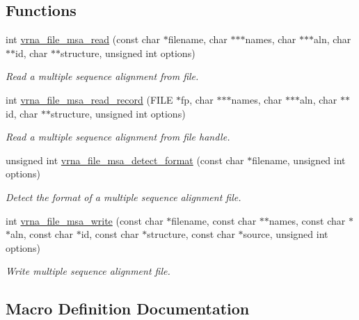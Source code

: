 \subsection*{Functions}
\begin{DoxyCompactItemize}
\item 
int \mbox{\hyperlink{group__file__formats__msa_gad02d5d12bda54611c915a1019323b7be}{vrna\+\_\+file\+\_\+msa\+\_\+read}} (const char $\ast$filename, char $\ast$$\ast$$\ast$names, char $\ast$$\ast$$\ast$aln, char $\ast$$\ast$id, char $\ast$$\ast$structure, unsigned int options)
\begin{DoxyCompactList}\small\item\em Read a multiple sequence alignment from file. \end{DoxyCompactList}\item 
int \mbox{\hyperlink{group__file__formats__msa_gad4203a438622b2df7bc2f16578d54799}{vrna\+\_\+file\+\_\+msa\+\_\+read\+\_\+record}} (F\+I\+LE $\ast$fp, char $\ast$$\ast$$\ast$names, char $\ast$$\ast$$\ast$aln, char $\ast$$\ast$id, char $\ast$$\ast$structure, unsigned int options)
\begin{DoxyCompactList}\small\item\em Read a multiple sequence alignment from file handle. \end{DoxyCompactList}\item 
unsigned int \mbox{\hyperlink{group__file__formats__msa_gade4fa8136ebb2d0f7eb3f8b59a8658e3}{vrna\+\_\+file\+\_\+msa\+\_\+detect\+\_\+format}} (const char $\ast$filename, unsigned int options)
\begin{DoxyCompactList}\small\item\em Detect the format of a multiple sequence alignment file. \end{DoxyCompactList}\item 
int \mbox{\hyperlink{group__file__formats__msa_gaccca55b71d34def88e18ed9a51ccb2bf}{vrna\+\_\+file\+\_\+msa\+\_\+write}} (const char $\ast$filename, const char $\ast$$\ast$names, const char $\ast$$\ast$aln, const char $\ast$id, const char $\ast$structure, const char $\ast$source, unsigned int options)
\begin{DoxyCompactList}\small\item\em Write multiple sequence alignment file. \end{DoxyCompactList}\end{DoxyCompactItemize}


\subsection{Macro Definition Documentation}
\mbox{\label{group__file__formats__msa_ga79a23de2c7249f2cccd762e475c81859}} 
